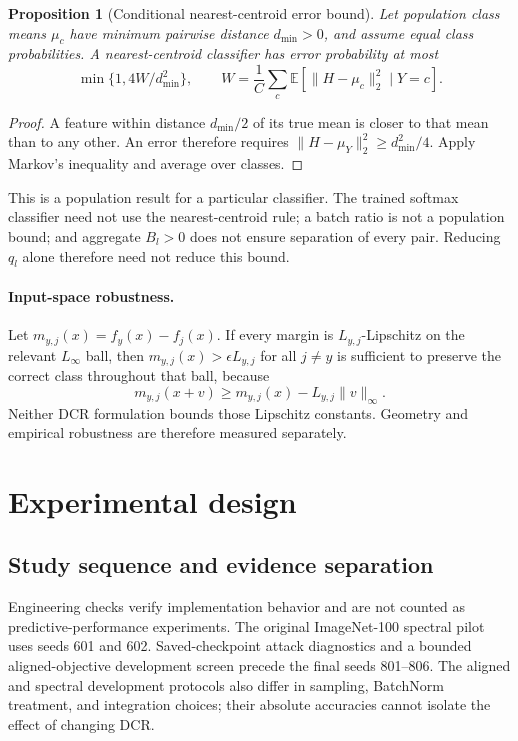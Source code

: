 \documentclass[a4paper,fleqn]{cas-dc}
\newtheorem{proposition}{Proposition}
\newcommand{\E}{\mathbb{E}}
\begin{document}
\begin{proposition}[Conditional nearest-centroid error bound]
\label{prop:centroid}
Let population class means $\mu_c$ have minimum pairwise distance
$d_{\min}>0$, and assume equal class probabilities. A
nearest-centroid classifier has error probability at most
\begin{equation}
 \min\{1,4W/d_{\min}^2\},
 \qquad
 W=\frac1C\sum_c
 \E[\|H-\mu_c\|_2^2\mid Y=c].
\end{equation}
\end{proposition}
\begin{proof}
A feature within distance $d_{\min}/2$ of its true mean is
closer to that mean than to any other. An error therefore requires
$\|H-\mu_Y\|_2^2\ge d_{\min}^2/4$.
Apply Markov's inequality and average over classes.
\end{proof}
This is a population result for a particular classifier.
The trained softmax classifier need not use the nearest-centroid
rule; a batch ratio is not a population bound; and aggregate
$B_l>0$ does not ensure separation of every pair.
Reducing $q_l$ alone therefore need not reduce this bound.

\paragraph{Input-space robustness.}
Let $m_{y,j}(x)=f_y(x)-f_j(x)$.
If every margin is $L_{y,j}$-Lipschitz on the relevant
$L_\infty$ ball, then
$m_{y,j}(x)>\epsilon L_{y,j}$ for all $j\ne y$ is sufficient
to preserve the correct class throughout that ball, because
\[
 m_{y,j}(x+v)\ge m_{y,j}(x)-L_{y,j}\|v\|_\infty.
\]
Neither DCR formulation bounds those Lipschitz constants.
Geometry and empirical robustness are therefore measured separately.


\section{Experimental design}\label{sec:experiments}

\subsection{Study sequence and evidence separation}\label{sec:study_sequence}

Engineering checks verify implementation behavior and are not counted
as predictive-performance experiments. The original ImageNet-100
spectral pilot uses seeds 601 and 602. Saved-checkpoint attack
diagnostics and a bounded aligned-objective development screen
precede the final seeds 801--806. The aligned and spectral
development protocols also differ in sampling, BatchNorm treatment,
and integration choices; their absolute accuracies cannot isolate
the effect of changing DCR.
\end{document}
